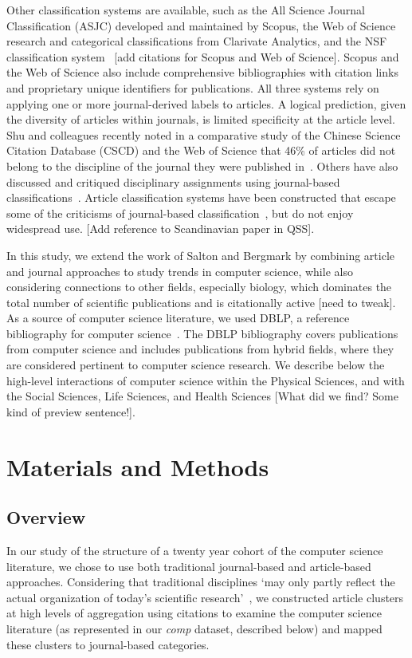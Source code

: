 Other classification systems are available, such as the All Science Journal Classification (ASJC) developed and maintained by Scopus, the Web of Science research and categorical classifications from Clarivate Analytics, and the NSF classification system~\cite{nsf_classification} [add citations for Scopus and Web of Science]. Scopus and the Web of Science also include comprehensive bibliographies with citation links and proprietary unique identifiers for publications. 
All three systems rely on applying one or more journal-derived labels to articles.  
A logical prediction, given the diversity of articles within journals, is limited specificity at the article level. 
Shu and colleagues recently noted in a comparative study of the Chinese Science Citation Database (CSCD)  and the Web of Science that 46\% of articles did not belong to the discipline of the journal they were published in~\cite{shu_comparing_2019}. 
Others have also discussed and critiqued disciplinary assignments using journal-based classifications~\cite{wang_large-scale_2016,perianes-rodriguez_comparison_2017}. 
Article classification systems have been constructed that escape some of the criticisms of journal-based classification~\cite{traag_louvain_2019,boyack_classification_2014,waltman_new_2012}, but do not enjoy widespread use. [Add reference to Scandinavian paper in QSS].
 
In this study, we extend the work of Salton and Bergmark by combining article and journal approaches to study trends in computer science, while also considering connections to other fields, especially biology, which dominates the total number of scientific publications and is citationally active [need to tweak]. As a source of computer science literature, we used DBLP, a reference bibliography for computer science~\cite{dblp_ref}. The DBLP bibliography covers publications from computer science and includes publications from hybrid fields, where they are considered pertinent to computer science research. We describe below the high-level interactions of computer science within the Physical Sciences, and with the Social Sciences, Life Sciences, and Health Sciences [What did we find? Some kind of preview sentence!].

\section{Materials and Methods}
\label{sec:methods}


 \subsection{Overview}
 In our study of the structure of a twenty year cohort of the computer science literature, we chose to use both traditional journal-based and article-based approaches. Considering that traditional disciplines `may only partly reflect the actual organization of today's scientific research'~\cite{waltman_new_2012}, we constructed article clusters at high levels of aggregation using citations to examine the  computer science literature (as represented in our \emph{comp} dataset, described below) and mapped these clusters to journal-based categories.
 
